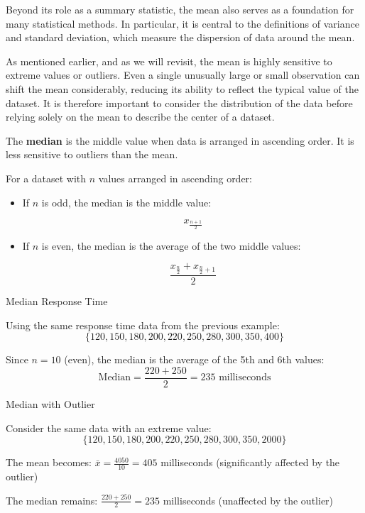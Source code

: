 Beyond its role as a summary statistic, the mean also serves as a foundation for many statistical methods. In particular, it is central to the definitions of variance and standard deviation, which measure the dispersion of data around the mean.

\begin{remark}
    As mentioned earlier, and as we will revisit, the mean is highly sensitive to extreme values or outliers. Even a single unusually large or small observation can shift the mean considerably, reducing its ability to reflect the typical value of the dataset.
    It is therefore important to consider the distribution of the data before relying solely on the mean to describe the center of a dataset.
\end{remark}

The \textbf{median} is the middle value when data is arranged in ascending order. It is less sensitive to outliers than the mean.

\begin{definition}[Median]
For a dataset with $n$ values arranged in ascending order:
\begin{itemize}
    \item If $n$ is odd, the median is the middle value:
     
    \[
    x_{\frac{n+1}{2}}
    \]

    \item If $n$ is even, the median is the average of the two middle values:
    
    \[
    \frac{x_{\frac{n}{2}} + x_{\frac{n}{2}+1}}{2}
    \]
    
\end{itemize}
\end{definition}

\begin{example} Median Response Time

Using the same response time data from the previous example:
\[
\{120, 150, 180, 200, 220, 250, 280, 300, 350, 400\}
\]

Since $n = 10$ (even), the median is the average of the 5th and 6th values:
\[
\text{Median} = \frac{220 + 250}{2} = 235 \text{ milliseconds}
\]
\end{example}

\begin{example} Median with Outlier

Consider the same data with an extreme value:
\[
\{120, 150, 180, 200, 220, 250, 280, 300, 350, 2000\}
\]

The mean becomes: $\bar{x} = \frac{4050}{10} = 405$ milliseconds (significantly affected by the outlier)

The median remains: $\frac{220 + 250}{2} = 235$ milliseconds (unaffected by the outlier)
\end{example}

